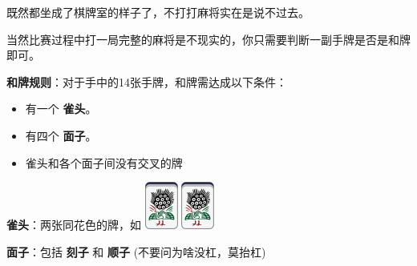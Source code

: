 \documentclass[
	lang=cn,
	color=green
]{elegantbook}
\begin{document}
既然都坐成了棋牌室的样子了，不打打麻将实在是说不过去。

当然比赛过程中打一局完整的麻将是不现实的，你只需要判断一副手牌是否是和牌即可。

\begin{remark}
	\hspace{0.15cm} \textbf{和牌规则}：对于手中的14张手牌，和牌需达成以下条件：

    \begin{itemize}
        \item 有一个 \textbf{雀头}。
        \item 有四个 \textbf{面子}。
        \item 雀头和各个面子间没有交叉的牌
    \end{itemize}

	\hspace{0.15cm} \textbf{雀头}：两张同花色的牌，如 \includegraphics[scale=0.5]{images/mahjong/1s.png} \includegraphics[scale=0.5]{images/mahjong/1s.png}
	
    \hspace{0.15cm} \textbf{面子}：包括 \textbf{刻子} 和 \textbf{顺子} (不要问为啥没杠，莫抬杠)


\end{remark}
\end{document}
